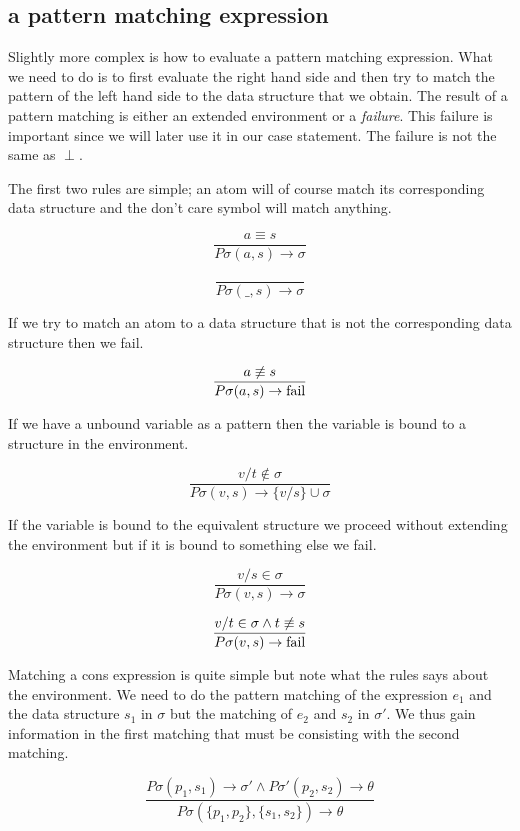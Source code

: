 \documentclass[a4paper,11pt]{article}
\begin{document}
\subsection{a pattern matching expression}

Slightly more complex is how to evaluate a pattern matching
expression. What we need to do is to first evaluate the right hand
side and then try to match the pattern of the left hand side to the
data structure that we obtain. The result of a pattern matching is
either an extended environment or a {\em failure}. This failure is
important since we will later use it in our case statement. The
failure is not the same as $\perp$.

The first two rules are simple; an atom will of course match its
corresponding data structure and the don't care symbol will match
anything.

$$\frac{a \equiv s}{P\sigma(a, s) \rightarrow \sigma}$$ 

$$\frac{}{P\sigma(\_,s) \rightarrow \sigma}$$

If we try to match an atom to a data structure that is not the
corresponding data structure then we fail.

$$\frac{a \not\equiv s}{P\sigma(a, s) \rightarrow {\rm fail}}$$ 

If we have a unbound variable as a pattern then the variable is bound to a
structure in the environment. 

$$\frac{v/t \not\in \sigma}{P\sigma(v, s) \rightarrow \lbrace v/s \rbrace \cup \sigma }$$ 

If the variable is bound to the equivalent structure we proceed
without extending the environment but if it is bound to something else
we fail.

$$\frac{v/s \in \sigma}{P\sigma(v, s) \rightarrow \sigma  }$$

$$\frac{v/t \in \sigma \wedge t \not\equiv s}{P\sigma(v, s) \rightarrow  {\rm fail} }$$ 

Matching a cons expression is quite simple but note what the rules
says about the environment. We need to do the pattern matching of the
expression $e_1$ and the data structure $s_1$ in $\sigma$ but the 
matching of $e_2$ and $s_2$ in $\sigma'$. We thus gain information in
the first matching that must be consisting with the second matching.

$$\frac{P\sigma(p_1, s_1) \rightarrow \sigma' \wedge P\sigma'(p_2, s_2) \rightarrow \theta}{P\sigma(\lbrace p_1, p_2 \rbrace  , \lbrace s_1, s_2 \rbrace) \rightarrow \theta}$$
\end{document}
